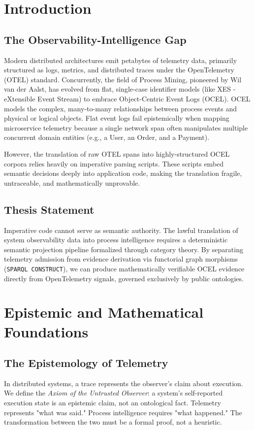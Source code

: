 \documentclass[12pt,a4paper,oneside]{book}
\begin{document}
\tableofcontents

\mainmatter

\chapter{Introduction}

\section{The Observability-Intelligence Gap}
Modern distributed architectures emit petabytes of telemetry data, primarily structured as logs, metrics, and distributed traces under the OpenTelemetry (OTEL) standard. Concurrently, the field of Process Mining, pioneered by Wil van der Aalst, has evolved from flat, single-case identifier models (like XES - eXtensible Event Stream) to embrace Object-Centric Event Logs (OCEL). OCEL models the complex, many-to-many relationships between process events and physical or logical objects. Flat event logs fail epistemically when mapping microservice telemetry because a single network span often manipulates multiple concurrent domain entities (e.g., a User, an Order, and a Payment). 

However, the translation of raw OTEL spans into highly-structured OCEL corpora relies heavily on imperative parsing scripts. These scripts embed semantic decisions deeply into application code, making the translation fragile, untraceable, and mathematically unprovable.

\section{Thesis Statement}
Imperative code cannot serve as semantic authority. The lawful translation of system observability data into process intelligence requires a deterministic semantic projection pipeline formalized through category theory. By separating telemetry admission from evidence derivation via functorial graph morphisms (\texttt{SPARQL CONSTRUCT}), we can produce mathematically verifiable OCEL evidence directly from OpenTelemetry signals, governed exclusively by public ontologies.

\chapter{Epistemic and Mathematical Foundations}

\section{The Epistemology of Telemetry}
In distributed systems, a trace represents the observer's claim about execution. We define the \textit{Axiom of the Untrusted Observer}: a system's self-reported execution state is an epistemic claim, not an ontological fact. Telemetry represents "what was said." Process intelligence requires "what happened." The transformation between the two must be a formal proof, not a heuristic.
\end{document}
